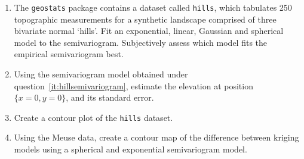 \begin{enumerate}

\item\label{it:hillsemivariogram} The \texttt{geostats} package
  contains a dataset called \texttt{hills}, which tabulates 250
  topographic measurements for a synthetic landscape comprised of
  three bivariate normal `hills'. Fit an exponential, linear, Gaussian
  and spherical model to the semivariogram. Subjectively assess which
  model fits the empirical semivariogram best.

\item Using the semivariogram model obtained under
  question~\ref{it:hillsemivariogram}, estimate the elevation at
  position $\{x=0,y=0\}$, and its standard error.

\item Create a contour plot of the \texttt{hills} dataset.
  
\item Using the Meuse data, create a contour map of the difference
  between kriging models using a spherical and exponential
  semivariogram model.

\end{enumerate}
